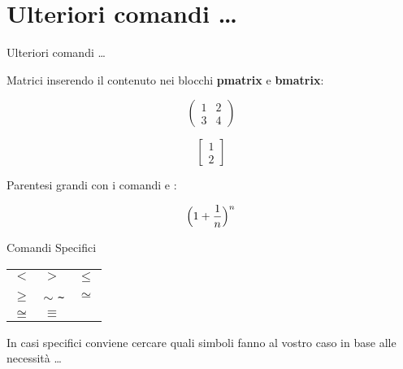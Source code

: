 \section{Ulteriori comandi \dots}
\begin{frame}{Ulteriori comandi \dots}

	Matrici inserendo il contenuto nei blocchi \textbf{pmatrix} e \textbf{bmatrix}: 

	\[
	\begin{pmatrix}
	1 & 2 \\
	3 & 4
	\end{pmatrix}
	\]

	\[
	\begin{bmatrix}
	1 \\
	2
	\end{bmatrix}
	\]

	Parentesi grandi con i comandi \texttt{\Bigl} e \texttt{\Bigr}  :

	\[
	\Bigl(1+\frac{1}{n}\Bigr)^n
	\]

\end{frame}

\begin{frame}{Comandi Specifici}

	\begin{table}[h!]
	\begin{tabular}{p{2.6cm} p{2.6cm} p{2.6cm}}
	\hline
	$<$ & $>$ & $\leq$ \texttt{\leq} \\[0.4cm]
	$\geq$ \texttt{\geq} & $\sim$ \texttt{\sim} & $\simeq$ \texttt{\simeq} \\[0.4cm]
	$\cong$ \texttt{\cong} & $\equiv$ \texttt{\equiv} & {}\\
	\hline
	\end{tabular}
	\end{table}

    In casi specifici conviene cercare quali simboli fanno al vostro caso in base alle necessità \dots

\end{frame}
